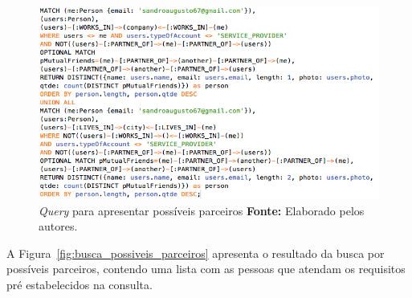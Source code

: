 \begin{figure}[h!]
	\centerline{\includegraphics[scale=0.6]{./imagens/consulta-busca-possiveis-parceiros.png}}
	\caption[\textit{Query} para apresentar possíveis parceiros.]
	{\textit{Query} para apresentar possíveis parceiros \textbf{Fonte:} Elaborado pelos autores.}
	\label{fig:consulta_possiveis_parceiros}
\end{figure}

\par A Figura~\ref{fig:busca_possiveis_parceiros} apresenta o resultado da busca por possíveis parceiros, contendo uma lista com as pessoas que atendam os requisitos pré estabelecidos na consulta.

